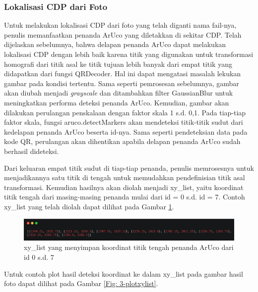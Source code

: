 \subsubsection{Lokalisasi CDP dari Foto}
Untuk melakukan lokalisasi CDP dari foto yang telah diganti nama fail-nya, penulis memanfaatkan penanda ArUco yang diletakkan di sekitar CDP. Telah dijelaskan
sebelumnya, bahwa delapan penanda ArUco dapat melakukan lokalisasi CDP dengan lebih baik karena titik yang digunakan untuk transformasi homografi dari titik
asal ke titik tujuan lebih banyak dari empat titik yang didapatkan dari fungsi QRDecoder. Hal ini dapat mengatasi masalah lekukan gambar pada kondisi
tertentu. Sama seperti pemrosesan sebelumnya, gambar akan diubah menjadi \emph{grayscale} dan ditambahkan filter GaussianBlur untuk meningkatkan performa
deteksi penanda ArUco. Kemudian, gambar akan dilakukan perulangan penskalaan dengan faktor skala 1 s.d. 0,1. Pada tiap-tiap faktor skala, fungsi
aruco.detectMarkers akan mendeteksi titik-titik sudut dari kedelapan penanda ArUco beserta id-nya. Sama seperti pendeteksian data pada kode QR, perulangan akan
dihentikan apabila delapan penanda ArUco sudah berhasil dideteksi.

Dari keluaran empat titik sudut di tiap-tiap penanda, penulis memrosesnya untuk menjadikannya satu titik di tengah untuk memudahkan pendefinisian titik asal
transformasi. Kemudian hasilnya akan diolah menjadi xy\_list, yaitu koordinat titik tengah dari masing-masing penanda mulai dari id = 0 s.d. id = 7. Contoh
xy\_list yang telah diolah dapat dilihat pada Gambar \ref{Fig: 3-xylist}.

\begin{figure}[h]
	\centering
	\includegraphics[width=13cm]{contents/chapter-3/3-xylist.png}
	\caption{xy\_list yang menyimpan koordinat titik tengah penanda ArUco dari id 0 s.d. 7}
	\label{Fig: 3-xylist}
\end{figure}

\noindent Untuk contoh plot hasil deteksi koordinat ke dalam xy\_list pada gambar hasil foto dapat dilihat pada Gambar \ref{Fig: 3-plotxylist}.

